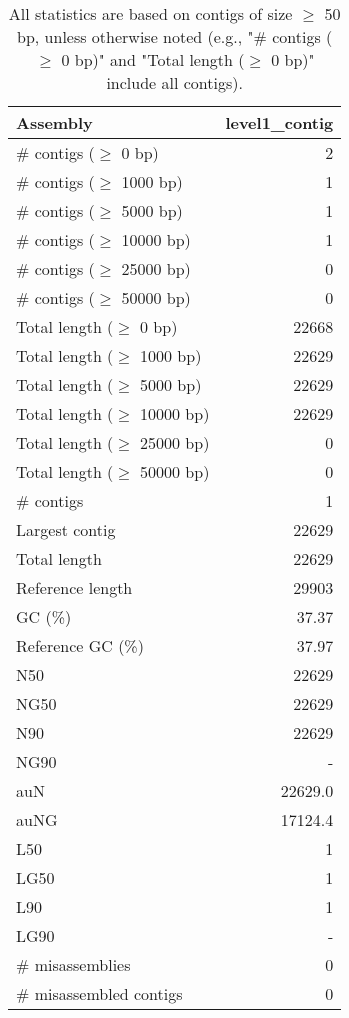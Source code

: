 \documentclass[12pt,a4paper]{article}
\begin{document}
\begin{table}[ht]
\begin{center}
\caption{All statistics are based on contigs of size $\geq$ 50 bp, unless otherwise noted (e.g., "\# contigs ($\geq$ 0 bp)" and "Total length ($\geq$ 0 bp)" include all contigs).}
\begin{tabular}{|l*{1}{|r}|}
\hline
Assembly & level1\_contig \\ \hline
\# contigs ($\geq$ 0 bp) & 2 \\ \hline
\# contigs ($\geq$ 1000 bp) & 1 \\ \hline
\# contigs ($\geq$ 5000 bp) & 1 \\ \hline
\# contigs ($\geq$ 10000 bp) & 1 \\ \hline
\# contigs ($\geq$ 25000 bp) & 0 \\ \hline
\# contigs ($\geq$ 50000 bp) & 0 \\ \hline
Total length ($\geq$ 0 bp) & 22668 \\ \hline
Total length ($\geq$ 1000 bp) & 22629 \\ \hline
Total length ($\geq$ 5000 bp) & 22629 \\ \hline
Total length ($\geq$ 10000 bp) & 22629 \\ \hline
Total length ($\geq$ 25000 bp) & 0 \\ \hline
Total length ($\geq$ 50000 bp) & 0 \\ \hline
\# contigs & 1 \\ \hline
Largest contig & 22629 \\ \hline
Total length & 22629 \\ \hline
Reference length & 29903 \\ \hline
GC (\%) & 37.37 \\ \hline
Reference GC (\%) & 37.97 \\ \hline
N50 & 22629 \\ \hline
NG50 & 22629 \\ \hline
N90 & 22629 \\ \hline
NG90 & - \\ \hline
auN & 22629.0 \\ \hline
auNG & 17124.4 \\ \hline
L50 & 1 \\ \hline
LG50 & 1 \\ \hline
L90 & 1 \\ \hline
LG90 & - \\ \hline
\# misassemblies & 0 \\ \hline
\# misassembled contigs & 0 \\ \hline

\end{tabular}
\end{center}
\end{table}
\end{document}

